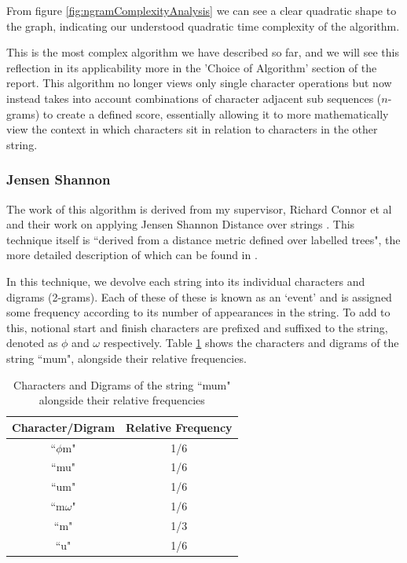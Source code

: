 \documentclass[a4paper,11pt]{article}
\begin{document}
From figure \ref{fig:ngramComplexityAnalysis} we can see a clear quadratic shape to the graph, indicating our understood quadratic time complexity of the algorithm.

This is the most complex algorithm we have described so far, and we will see this reflection in its applicability more in the 'Choice of Algorithm' section of the report. This algorithm no longer views only single character operations but now instead takes into account combinations of character adjacent sub sequences ($n$-grams) to create a defined score, essentially allowing it to more mathematically view the context in which characters sit in relation to characters in the other string.

\subsubsection{Jensen Shannon}
The work of this algorithm is derived from my supervisor, Richard Connor et al and their work on applying Jensen Shannon Distance over strings \citep{richardsPaper}. This technique itself is ``derived from a distance metric defined over labelled trees", the more detailed description of which can be found in \citep{jensenShannonTrees}.

In this technique, we devolve each string into its individual characters and digrams (2-grams). Each of these of these is known as an `event' and is assigned some frequency according to its number of appearances in the string. To add to this, notional start and finish characters are prefixed and suffixed to the string, denoted as $\phi$ and $\omega$ respectively. Table \ref{table:mumTable} shows the characters and digrams of the string ``mum", alongside their relative frequencies.

\begin{table}[]
    \centering
    \begin{tabular}{|c|c|}
\hline
    Character/Digram & Relative Frequency \\
    \hline
    ``$\phi$m" & 1/6\\ 
    ``mu" & 1/6\\ 
    ``um" & 1/6\\ 
    ``m$\omega$" & 1/6\\ 
    ``m" & 1/3\\ 
    ``u" & 1/6\\
    \hline
\end{tabular}
    \caption{Characters and Digrams of the string ``mum" alongside their relative frequencies}
    \label{table:mumTable}
\end{table}
\end{document}
